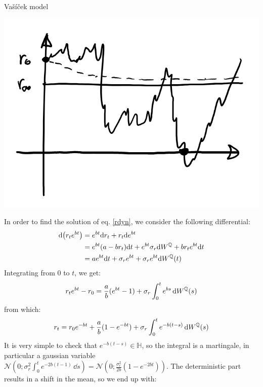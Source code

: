 \begin{example}{Vašíček model}{}{}
    \begin{center}\label{fig:vasicek}
        \includegraphics[scale=0.3]{fig/tmp/fig30.png}
    \end{center}
    In order to find the solution of eq. \eqref{rdyn}, we consider the following differential:
    \begin{align}
        \notag \dd(r_te^{bt}) &= e^{bt}\dd r_t + r_t\dd e^{bt} \\
        &= 
        \notag e^{bt}(a-br_t)\dd t + e^{bt}\sigma_r \dd W^{\mathbb{Q}} + br_te^{bt}\dd t \\
        &= 
        ae^{bt}\dd t + \sigma_r e^{bt} + \sigma_r e^{bt} \dd W^{\mathbb{Q}}(t)
    \end{align}
    Integrating from 0 to $t$, we get:
    \begin{align}
        r_t e^{bt} - r_0 = \frac{a}{b}(e^{bt}-1) + \sigma_r \int_0^t e^{bs}\,\dd W^{\mathbb{Q}}(s)
    \end{align}
    from which:
    \begin{equation}
        r_t = r_0e^{-bt} + \frac{a}{b}(1-e^{-bt}) + \sigma_r \int_0^t e^{-b(t-s)}\,\dd W^{\mathbb{Q}}(s)
    \end{equation}
    It is very simple to check that $e^{-b(t-s)}\in\mathbb{H}$, so the integral is a martingale, in particular a gaussian variable $\mathcal{N}\left(0;\sigma_r^2\int_0^te^{-2b(t-1)}\,\dd s\right) = \mathcal{N}\left(0;\frac{\sigma^2_r}{2b}\left(1-e^{-2bt}\right)\right)$. The deterministic part results in a shift in the mean, so we end up with:

\end{example}
